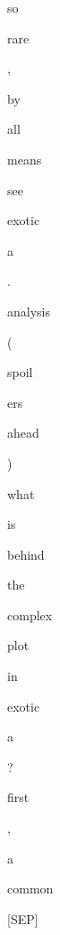 \documentclass[varwidth=150mm]{standalone}
\begin{document}
\begin{CJK*}{UTF8}{gbsn}
{{{\colorbox{red!0.0}{\strut so} \colorbox{red!0.0}{\strut rare} \colorbox{red!1.4909080266952515}{\strut ,} \colorbox{red!0.0}{\strut by} \colorbox{red!4.367077350616455}{\strut all} \colorbox{red!0.0}{\strut means} \colorbox{red!0.0}{\strut see} \colorbox{red!29.90720558166504}{\strut exotic}\colorbox{red!2.5320351123809814}{\strut a} \colorbox{red!1.738939642906189}{\strut .} \colorbox{red!50.417640686035156}{\strut analysis} \colorbox{red!3.747628688812256}{\strut (} \colorbox{red!2.3476154804229736}{\strut *} \colorbox{red!1.3513984680175781}{\strut *} \colorbox{red!13.781538963317871}{\strut spoil}\colorbox{red!7.172367095947266}{\strut ers} \colorbox{red!20.797809600830078}{\strut *} \colorbox{red!22.426197052001953}{\strut *} \colorbox{red!3.181520462036133}{\strut ahead} \colorbox{red!14.675004005432129}{\strut )} \colorbox{red!7.730882167816162}{\strut what} \colorbox{red!1.6296466588974}{\strut is} \colorbox{red!1.3998554944992065}{\strut behind} \colorbox{red!3.1197257041931152}{\strut the} \colorbox{red!1.5140020847320557}{\strut complex} \colorbox{red!1.9109970331192017}{\strut plot} \colorbox{red!1.3463134765625}{\strut in} \colorbox{red!54.39907455444336}{\strut exotic}\colorbox{red!11.762837409973145}{\strut a} \colorbox{red!5.984634876251221}{\strut ?} \colorbox{red!53.380611419677734}{\strut first} \colorbox{red!2.7887258529663086}{\strut ,} \colorbox{red!6.785877704620361}{\strut a} \colorbox{red!5.92351770401001}{\strut common} \colorbox{red!2.7054836750030518}{\strut [SEP]}
}}}
\end{CJK*}
\end{document}

